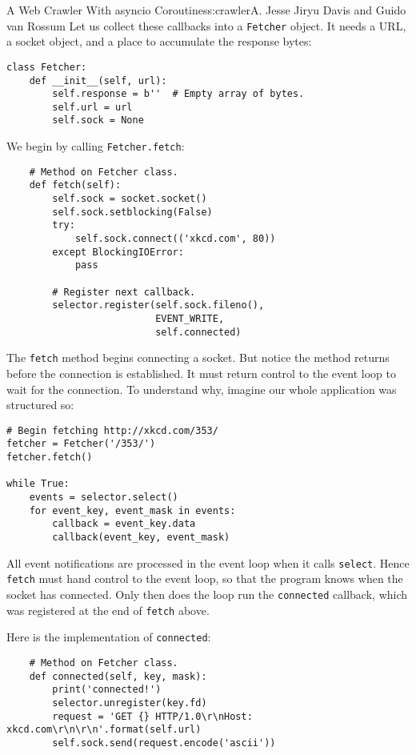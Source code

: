 \begin{aosachapter}{A Web Crawler With asyncio Coroutines}{s:crawler}{A. Jesse Jiryu Davis and Guido van Rossum}
Let us collect these callbacks into a \texttt{Fetcher} object. It needs
a URL, a socket object, and a place to accumulate the response bytes:

\begin{verbatim}
class Fetcher:
    def __init__(self, url):
        self.response = b''  # Empty array of bytes.
        self.url = url
        self.sock = None
\end{verbatim}

We begin by calling \texttt{Fetcher.fetch}:

\begin{verbatim}
    # Method on Fetcher class.
    def fetch(self):
        self.sock = socket.socket()
        self.sock.setblocking(False)
        try:
            self.sock.connect(('xkcd.com', 80))
        except BlockingIOError:
            pass
            
        # Register next callback.
        selector.register(self.sock.fileno(),
                          EVENT_WRITE,
                          self.connected)
\end{verbatim}

The \texttt{fetch} method begins connecting a socket. But notice the
method returns before the connection is established. It must return
control to the event loop to wait for the connection. To understand why,
imagine our whole application was structured so:

\begin{verbatim}
# Begin fetching http://xkcd.com/353/
fetcher = Fetcher('/353/')
fetcher.fetch()

while True:
    events = selector.select()
    for event_key, event_mask in events:
        callback = event_key.data
        callback(event_key, event_mask)
\end{verbatim}

All event notifications are processed in the event loop when it calls
\texttt{select}. Hence \texttt{fetch} must hand control to the event
loop, so that the program knows when the socket has connected. Only then
does the loop run the \texttt{connected} callback, which was registered
at the end of \texttt{fetch} above.

Here is the implementation of \texttt{connected}:

\begin{verbatim}
    # Method on Fetcher class.
    def connected(self, key, mask):
        print('connected!')
        selector.unregister(key.fd)
        request = 'GET {} HTTP/1.0\r\nHost: xkcd.com\r\n\r\n'.format(self.url)
        self.sock.send(request.encode('ascii'))
        

\end{verbatim}
\end{aosachapter}

